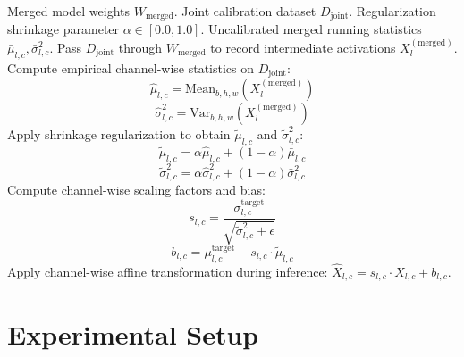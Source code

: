 \documentclass{article}
\theoremstyle{plain}
\theoremstyle{definition}
\theoremstyle{remark}
\begin{document}
\begin{algorithm}[h]
\caption{Regularized Task-Agnostic Activation Calibration}
\label{alg:rtaac}
\begin{algorithmic}[1]
\REQUIRE Merged model weights $W_{\text{merged}}$.
\REQUIRE Joint calibration dataset $D_{\text{joint}}$.
\REQUIRE Regularization shrinkage parameter $\alpha \in [0.0, 1.0]$.
\REQUIRE Uncalibrated merged running statistics $\bar{\mu}_{l, c}, \bar{\sigma}_{l, c}^2$.
    \STATE Pass $D_{\text{joint}}$ through $W_{\text{merged}}$ to record intermediate activations $X_l^{(\text{merged})}$.
    \STATE Compute empirical channel-wise statistics on $D_{\text{joint}}$:
    $$\hat{\mu}_{l, c} = \text{Mean}_{b,h,w}(X_l^{(\text{merged})})$$
    $$\hat{\sigma}_{l, c}^2 = \text{Var}_{b,h,w}(X_l^{(\text{merged})})$$
    \STATE Apply shrinkage regularization to obtain $\tilde{\mu}_{l,c}$ and $\tilde{\sigma}_{l,c}^2$:
    $$\tilde{\mu}_{l, c} = \alpha \hat{\mu}_{l, c} + (1 - \alpha) \bar{\mu}_{l, c}$$
    $$\tilde{\sigma}_{l, c}^2 = \alpha \hat{\sigma}_{l, c}^2 + (1 - \alpha) \bar{\sigma}_{l, c}^2$$
    \STATE Compute channel-wise scaling factors and bias:
    $$s_{l,c} = \frac{\sigma_{l,c}^{\text{target}}}{\sqrt{\tilde{\sigma}_{l,c}^2 + \epsilon}}$$
    $$b_{l,c} = \mu_{l,c}^{\text{target}} - s_{l,c} \cdot \tilde{\mu}_{l,c}$$
\ENDFOR
\STATE Apply channel-wise affine transformation during inference: $\hat{X}_{l,c} = s_{l,c} \cdot X_{l,c} + b_{l,c}$.
\end{algorithmic}
\end{algorithm}

\section{Experimental Setup}
\label{sec:setup}
\end{document}
